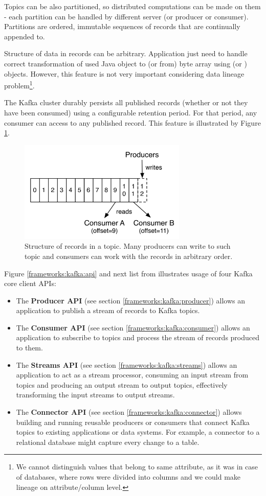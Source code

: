 Topics can be also partitioned, so distributed computations can be made
on them - each partition can be handled by different server (or producer or consumer).
Partitions are ordered, immutable sequences of records that are continually appended to.

Structure of data in records can be arbitrary. Application just need to handle
correct transformation of used Java object to (or from) byte array using
 (or ) objects.
However, this feature is not very important considering data lineage problem\footnote{
  We cannot distinguish values that belong to same attribute, as it was in case
  of databases, where rows were divided into columns and we could make
  lineage on attribute/column level.
}.

The Kafka cluster durably persists all published records (whether or not they have been consumed)
using a configurable retention period. For that period, any consumer can access
to any published record. This feature is illustrated by Figure \ref{frameworks:kafka:topic}.

\begin{figure}[h]
  \center
  \includegraphics[width=80mm]{img/kafka-topic-structure.png}
  \caption{Structure of records in a topic. Many producers can write to such topic and consumers can work with the records in arbitrary order.}
  \label{frameworks:kafka:topic}
\end{figure}

Figure \ref{frameworks:kafka:api} and next list from \citet{Kafka}
illustrates usage of four Kafka core client APIs:
\begin{itemize}
  \item The \textbf{Producer API} (see section \ref{frameworks:kafka:producer}) allows an application to publish
    a stream of records to Kafka topics.
  \item The \textbf{Consumer API} (see section \ref{frameworks:kafka:consumer}) allows an application to subscribe
    to topics and process the stream of records produced to them.
  \item The \textbf{Streams API} (see section \ref{frameworks:kafka:streams}) allows an application to act as a stream processor,
    consuming an input stream from topics and producing an output stream to output topics,
    effectively transforming the input streams to output streams.
  \item The \textbf{Connector API} (see section \ref{frameworks:kafka:connector}) allows building and running reusable producers or consumers
    that connect Kafka topics to existing applications or data systems.
    For example, a connector to a relational database might capture every change to a table. 
\end{itemize}

